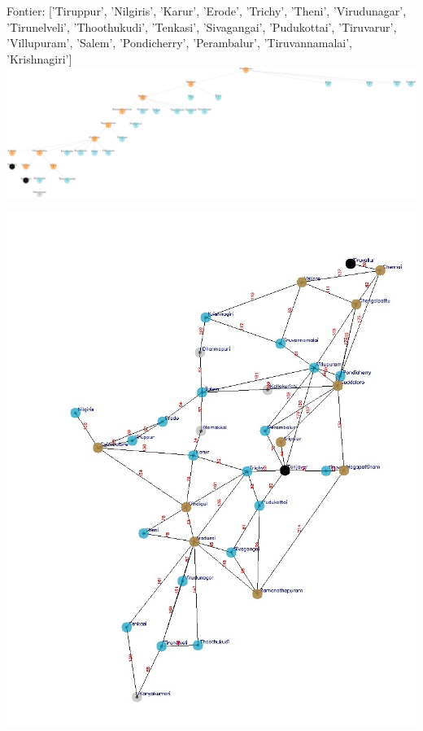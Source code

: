 \documentclass[xcolor=table]{beamer}
\begin{document}
\begin{frame}
  { \tiny Fontier: ['Tiruppur', 'Nilgiris', 'Karur', 'Erode', 'Trichy', 'Theni', 'Virudunagar', 'Tirunelveli', 'Thoothukudi', 'Tenkasi', 'Sivagangai', 'Pudukottai', 'Tiruvarur', 'Villupuram', 'Salem', 'Pondicherry', 'Perambalur', 'Tiruvannamalai', 'Krishnagiri']}
  \includegraphics[width=1\textwidth]{../DFSNodes/16-1.png}
  \begin{center}
    \includegraphics[height=0.45\textheight]{../DFSoutput/tamilDFS14.jpg}
  \end{center}
\end{frame}
\end{document}

